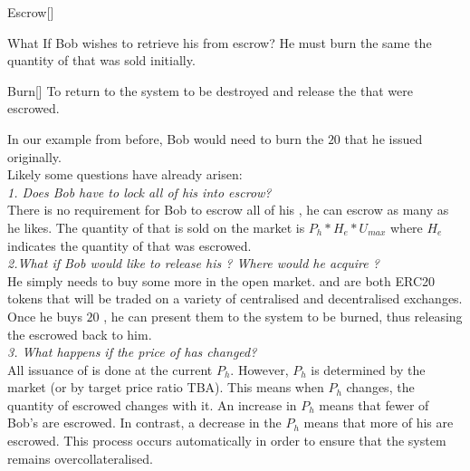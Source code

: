 \begin{namedthm*}{Escrow}[]
\newpage

\noindent What If Bob wishes to retrieve his \HAV{} from escrow? He must burn the same the quantity of \NOM{} that was sold initially. \\

\begin{namedthm}{Burn}[]
To return \NOM{} to the system to be destroyed and release the \HAV{} that were escrowed. 
\end{namedthm}

\noindent In our example from before, Bob would need to burn the $20$ \NOM{} that he issued originally. \\

\noindent Likely some questions have already arisen: \\

\noindent \emph{1. Does Bob have to lock all of his \HAV{} into escrow?} \\ 

\noindent There is no requirement for Bob to escrow all of his \HAV{}, he can escrow as many as he likes. The quantity of \NOM{} that is sold on the market is $ P_h * H_e * U_{max} $ where $H_e$ indicates the quantity of \HAV{} that was escrowed. \\

\noindent \emph{2.What if Bob would like to release his \HAV{}? Where would he acquire \NOM{}?} \\ 

\noindent He simply needs to buy some more in the open market. \HAV{} and \NOM{} are both ERC20 tokens that will be traded on a variety of centralised and decentralised exchanges. Once he buys $20$ \NOM{}, he can present them to the system to be burned, thus releasing the escrowed \HAV{} back to him. \\ 

\noindent \emph{3. What happens if the price of \HAV{} has changed?} \\

\noindent All issuance of \NOM{} is done at the current $P_h$. However, $P_h$ is determined by the market (or by target price ratio TBA). This means when $P_h$ changes, the quantity of escrowed \HAV{} changes with it. An increase in $P_h$ means that fewer of Bob's \HAV{} are escrowed. In contrast, a decrease in the $P_h$ means that more of his \HAV{} are escrowed. This process occurs automatically in order to ensure that the system remains overcollateralised. \\ 


\end{namedthm*}
